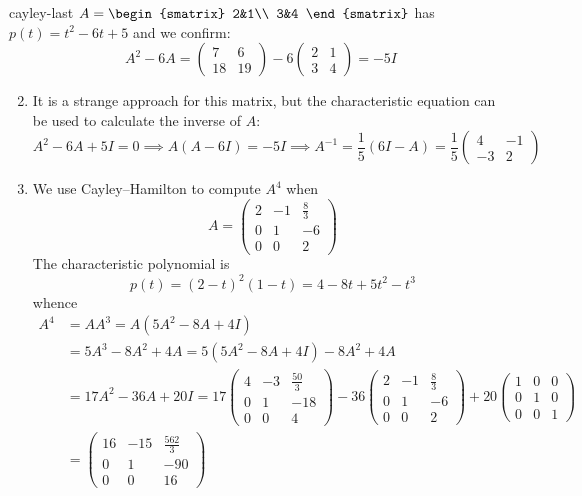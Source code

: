 \begin{examples}{}{cayley-last}
	\exstart $A=
	\begin{smatrix}
		2&1\\
		3&4
	\end{smatrix}$ has $p(t)=t^2-6t+5$ and we confirm:
	\[
		A^2-6A=
		\begin{pmatrix}
	  	7&6\\
	  	18&19
		\end{pmatrix}
		-6
		\begin{pmatrix}
	  	2&1\\
	  	3&4
		\end{pmatrix}
		=-5I
	\]\vspace{-5pt}
	\begin{enumerate}\setcounter{enumi}{1}
	  \item[] It is a strange approach for this matrix, but the characteristic equation can be used to calculate the inverse of $A$:
	\[
		A^2-6A+5I=0\implies A(A-6I)=-5I\implies A^{-1}=\frac 15(6I-A)=\frac 15
		\begin{pmatrix}
	  	4&-1\\
	  	-3&2
		\end{pmatrix}
	\]
		\item We use Cayley--Hamilton to compute $A^4$ when
		\[
			A=
			\begin{pmatrix}
				2&-1&\frac 83\\
				0&1&-6\\
				0&0&2
			\end{pmatrix}
		\]
		The characteristic polynomial is 
		\[
			p(t)=(2-t)^2(1-t)=4-8t+5t^2-t^3
		\]
		whence
		\begin{align*}
			A^4&=AA^3=A(5A^2-8A+4I)\\
			&=5A^3-8A^2+4A=5(5A^2-8A+4I)-8A^2+4A\\
			&=17A^2-36A+20I=17
			\begin{pmatrix}
				4&-3&\frac{50}3\\
				0&1&-18\\
				0&0&4
			\end{pmatrix}
			-36
			\begin{pmatrix}
				2&-1&\frac 83\\
				0&1&-6\\
				0&0&2
			\end{pmatrix}
			+20
			\begin{pmatrix}
				1&0&0\\
				0&1&0\\
				0&0&1
			\end{pmatrix}\\
			&=
			\begin{pmatrix}
				16&-15&\frac{562}3\\
				0&1&-90\\
				0&0&16
			\end{pmatrix}
		\end{align*}
		

\end{enumerate}
\end{examples}
